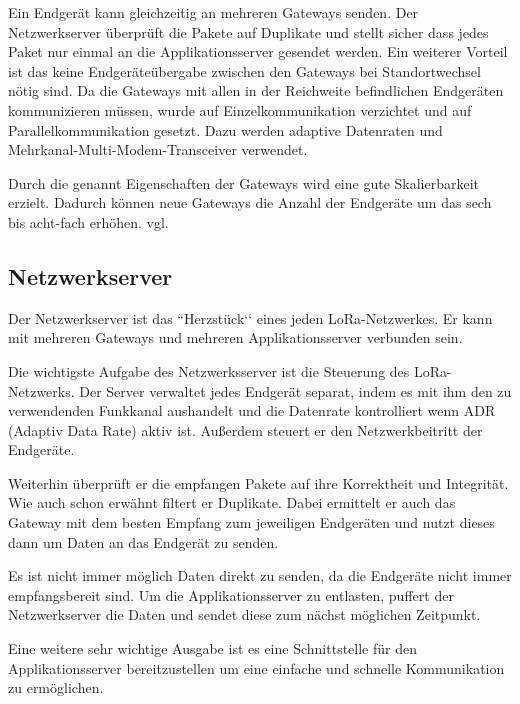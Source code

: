\documentclass[a4paper, 12pt]{article}
\begin{document}
            Ein Endgerät kann gleichzeitig an mehreren Gateways senden. Der Netzwerkserver überprüft die Pakete 
            auf Duplikate und stellt sicher dass jedes Paket nur einmal an die Applikationsserver gesendet werden.
            Ein weiterer Vorteil ist das keine Endgeräteübergabe zwischen den Gateways bei Standortwechsel nötig sind.
            Da die Gateways mit allen in der Reichweite befindlichen Endgeräten kommunizieren müssen, wurde 
            auf Einzelkommunikation verzichtet und auf Parallelkommunikation gesetzt. 
            Dazu werden adaptive Datenraten und Mehrkanal-Multi-Modem-Transceiver verwendet.
        
            Durch die genannt Eigenschaften der Gateways wird eine gute Skalierbarkeit erzielt. Dadurch können neue 
            Gateways die Anzahl der Endgeräte um das sech bis acht-fach erhöhen. vgl. \cite[S.10]{WhatIsLoRa}
        \subsection{Netzwerkserver}
            Der Netzwerkserver ist das ``Herzstück‘‘ eines jeden LoRa-Netzwerkes. Er kann mit mehreren Gateways und 
            mehreren Applikationsserver verbunden sein. 

            Die wichtigste Aufgabe des Netzwerksserver ist die Steuerung des LoRa-Netzwerks. Der Server 
            verwaltet jedes Endgerät separat, indem es mit ihm den zu verwendenden Funkkanal aushandelt und die Datenrate
             kontrolliert wenn ADR (Adaptiv Data Rate) aktiv ist. Außerdem steuert er den Netzwerkbeitritt der 
             Endgeräte.

            Weiterhin überprüft er die empfangen Pakete auf ihre Korrektheit und Integrität. Wie auch schon erwähnt 
            filtert er Duplikate.
            Dabei ermittelt er auch das Gateway mit dem besten Empfang zum jeweiligen Endgeräten und nutzt 
            dieses dann um Daten an das Endgerät zu senden.

            Es ist nicht immer möglich Daten direkt zu senden, da die Endgeräte nicht immer empfangsbereit sind. Um 
            die Applikationsserver zu entlasten, puffert der Netzwerkserver die Daten und sendet diese zum nächst 
            möglichen Zeitpunkt.

            Eine weitere sehr wichtige Ausgabe ist es eine Schnittstelle für den Applikationsserver bereitzustellen 
            um eine 
            einfache und schnelle Kommunikation zu ermöglichen.
\end{document}
